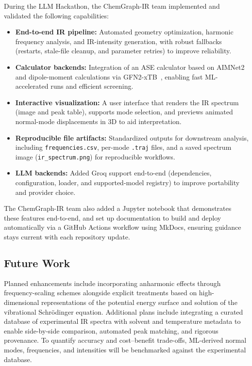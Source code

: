 During the LLM Hackathon, the ChemGraph-IR team implemented and validated the following capabilities:
\begin{itemize}
  \item \textbf{End-to-end IR pipeline:} Automated geometry optimization, harmonic frequency analysis, and IR-intensity generation, with robust fallbacks (restarts, stale-file cleanup, and parameter retries) to improve reliability.
  \item \textbf{Calculator backends:} Integration of an ASE calculator based on AIMNet2~\cite{AIMNet2_PNASplus_2025} and dipole-moment calculations via GFN2-xTB~\cite{bannwarth2019gfn2}, enabling fast ML-accelerated runs and efficient screening.
  \item \textbf{Interactive visualization:} A user interface that renders the IR spectrum (image and peak table), supports mode selection, and previews animated normal-mode displacements in 3D to aid interpretation.
  \item \textbf{Reproducible file artifacts:} Standardized outputs for downstream analysis, including \texttt{frequencies.csv}, per-mode \texttt{.traj} files, and a saved spectrum image (\texttt{ir\_spectrum.png}) for reproducible workflows.
  \item \textbf{LLM backends:} Added Groq support end-to-end (dependencies, configuration, loader, and supported-model registry) to improve portability and provider choice.
\end{itemize}

The ChemGraph-IR team also added a Jupyter notebook that demonstrates these features end-to-end, and set up documentation to build and deploy automatically via a GitHub Actions workflow using MkDocs, ensuring guidance stays current with each repository update.

\subsection*{Future Work}
Planned enhancements include incorporating anharmonic effects through frequency-scaling schemes alongside explicit treatments based on high-dimensional representations of the potential energy surface and solution of the vibrational Schrödinger equation.
Additional plans include integrating a curated database of experimental IR spectra with solvent and temperature metadata to enable side-by-side comparison, automated peak matching, and rigorous provenance.
To quantify accuracy and cost--benefit trade-offs, ML-derived normal modes, frequencies, and intensities will be benchmarked against the experimental database.

